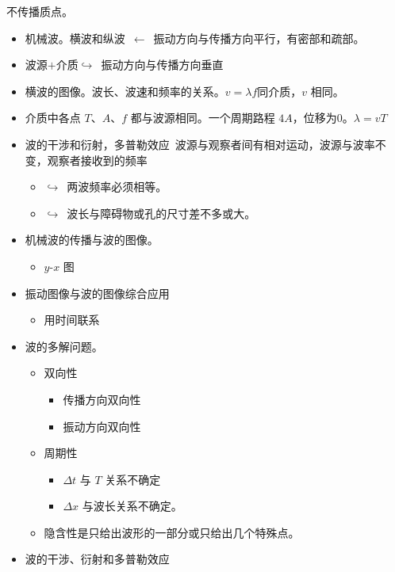 不传播质点。
\begin{itemize}
\item 机械波。横波和纵波\ $\leftarrow$\ 振动方向与传播方向平行，有密部和疏部。
\item 波源$+$介质\quad $\hookrightarrow$\ 振动方向与传播方向垂直
\item 横波的图像。波长、波速和频率的关系。\quad $v=\lambda f$\quad 同介质，$v$ 相同。
\item 介质中各点 $T$、$A$、$f$ 都与波源相同。一个周期路程 $4A$，位移为0。\quad $\lambda=vT$
\item 波的干涉和衍射，多普勒效应\ 波源与观察者间有相对运动，波源与波率不变，观察者接收到的频率
  \begin{itemize}
  \item $\hookrightarrow$\ 两波频率必须相等。
  \item $\hookrightarrow$\ 波长与障碍物或孔的尺寸差不多或大。
  \end{itemize}
\end{itemize}
\begin{itemize}
\item 机械波的传播与波的图像。
  \begin{itemize}
  \item $y$-$x$ 图
  \end{itemize}
\item 振动图像与波的图像综合应用
  \begin{itemize}
  \item 用时间联系
  \end{itemize}
\item 波的多解问题。
  \begin{itemize}
  \item 双向性
    \begin{itemize}
    \item 传播方向双向性
    \item 振动方向双向性
    \end{itemize}
  \item 周期性
    \begin{itemize}
    \item $\Delta t$ 与 $T$ 关系不确定
    \item $\Delta x$ 与波长关系不确定。
    \end{itemize}
  \item 隐含性\quad 是只给出波形的一部分或只给出几个特殊点。
  \end{itemize}
\item 波的干涉、衍射和多普勒效应
\end{itemize}

